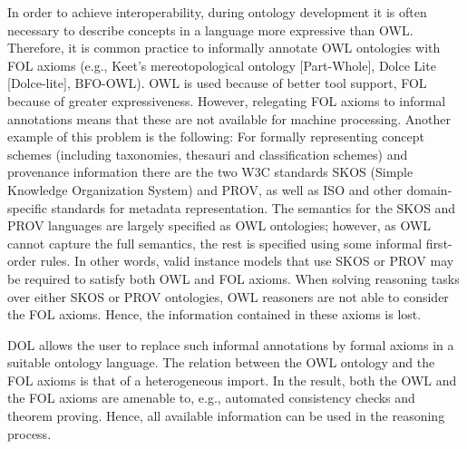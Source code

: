 \documentclass[10pt,%
\ifpretendfinal
final%
\else
draft%
\fi,
]{scrreprt}
\begin{document}
In order to achieve interoperability, during ontology development it is often necessary to describe concepts in a language more expressive than OWL. 
Therefore, it is common practice to informally annotate OWL ontologies with FOL axioms (e.g., Keet's mereotopological ontology [Part-Whole], 
Dolce Lite [Dolce-lite], BFO-OWL). OWL is used because of better tool support, FOL because of greater expressiveness. However, relegating FOL axioms to 
informal annotations means that these are not available for machine processing. 
Another example of this problem is the following: For formally representing concept schemes (including taxonomies, thesauri and classification schemes) and 
provenance information there are the two W3C standards SKOS (Simple Knowledge Organization System) and PROV, as well as ISO and other domain-specific 
standards for metadata representation. The semantics for the SKOS and PROV languages are largely specified as OWL ontologies; however, as OWL cannot 
capture the full semantics, the rest is specified using some informal first-order rules. In other words, valid instance models that use SKOS or PROV may be 
required to satisfy both OWL and FOL axioms. When solving reasoning tasks over either SKOS or PROV ontologies, OWL reasoners are not able to consider the 
FOL axioms. Hence, the information contained in these axioms is lost.

DOL allows the user to replace such informal annotations by formal axioms in a suitable ontology language. The relation between the 
OWL ontology and the FOL axioms is that of a heterogeneous import. In the result, both the OWL and the FOL axioms are amenable to, e.g., automated consistency 
checks and theorem proving. Hence, all available information can be used in the reasoning process.
\end{document}
